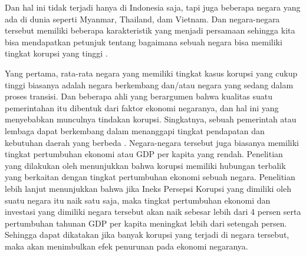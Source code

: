 \documentclass[11pt]{article}
\begin{document}
Dan hal ini tidak terjadi hanya di Indonesia saja, tapi juga beberapa negara yang
ada di dunia seperti Myanmar, Thailand, dam Vietnam. Dan negara-negara tersebut
memiliki beberapa karakteristik yang menjadi persamaan sehingga kita bisa 
mendapatkan petunjuk tentang bagaimana sebuah negara bisa memiliki tingkat korupsi 
yang tinggi \citep{svenssonEightQuestionsCorruption2005}.

Yang pertama, rata-rata negara yang memiliki tingkat kasus korupsi yang cukup
tinggi biasanya adalah negara berkembang dan/atau negara yang sedang dalam 
proses transisi. Dan beberapa ahli yang berargumen bahwa kualitas suatu pemerintahan
itu dibentuk dari faktor ekonomi negaranya, dan hal ini yang menyebabkan munculnya
tindakan korupsi. Singkatnya, sebuah pemerintah atau lembaga dapat berkembang dalam 
menanggapi tingkat pendapatan dan kebutuhan daerah yang berbeda
\citetext{\citealp{demsetzTheoryPropertyRights1974, lipsetPoliticalManSocial1960}
dalam \citealp{svenssonEightQuestionsCorruption2005}}. Negara-negara tersebut
juga biasanya memiliki tingkat pertumbuhan ekonomi atau GDP per kapita 
yang rendah. Penelitian yang dilakukan oleh \citet{paolomauroEconomicIssuesNo1997}
menunjukkan bahwa korupsi memiliki hubungan terbalik yang berkaitan dengan tingkat
pertumbuhan ekonomi sebuah negara. Penelitian lebih lanjut menunjukkan bahwa jika
Ineks Persepsi Korupsi yang dimiliki oleh suatu negara itu naik satu saja,
maka tingkat pertumbuhan ekonomi dan investasi yang dimiliki negara tersebut akan 
naik sebesar lebih dari 4 persen serta pertumbuhan tahunan GDP per kapita meningkat
lebih dari setengah persen. Sehingga dapat dikatakan jika banyak korupsi yang terjadi
di negara tersebut, maka akan menimbulkan efek penurunan pada ekonomi negaranya.
\end{document}
